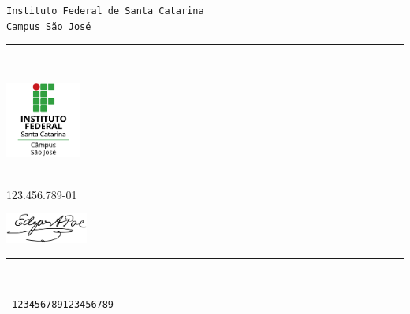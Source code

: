 \documentclass[11pt,a4paper]{memoir}
\begin{document}
    \begin{Spacing}{0.75}%
    \noindent
    \texttt{\fontsize{4mm}{5mm}\selectfont Instituto Federal de Santa Catarina}\\
    \texttt{\fontsize{3mm}{4mm}\selectfont Campus São José }\\ 
    \rule{74mm}{.3mm}\\
    \begin{minipage}[t]{33mm}
        \vspace{-2mm}%
        \hspace{-4mm}\includegraphics[height=25mm]{logo-ifsc-saojose.png}
    \end{minipage}
    \hspace{1mm}
    \begin{minipage}[t]{42mm}
        \vspace{-1mm}%
        \begin{flushleft}
        {\scriptsize
            \begin{Spacing}{1}%
            \vspace{1mm}
            \\
             \hspace{1mm} 123.456.789-01\\
            \end{Spacing}
        }
    \begin{minipage}[t]{33mm}
        \vspace{-1mm}%
        \includegraphics[height=10mm]{assinatura.png}
    \end{minipage}
        \end{flushleft}
    \end{minipage}
    \vspace{0mm}
    \rule{74mm}{0.3mm}\\
    \end{Spacing}
    \vspace{-5mm} \hspace{40mm} \texttt{\fontsize{2mm}{3mm} 123456789123456789}
\end{document}
